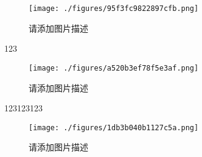 
\begin{figure}[ht]
\centering
\texttt{[image: ./figures/95f3fc9822897cfb.png]}
\caption{请添加图片描述} \label{fig_testMg_5}
\end{figure}

123

\begin{figure}[ht]
\centering
\texttt{[image: ./figures/a520b3ef78f5e3af.png]}
\caption{请添加图片描述} \label{fig_testMg_4}
\end{figure}

123123123


\begin{figure}[ht]
\centering
\texttt{[image: ./figures/1db3b040b1127c5a.png]}
\caption{请添加图片描述} \label{fig_testMg_6}
\end{figure}

